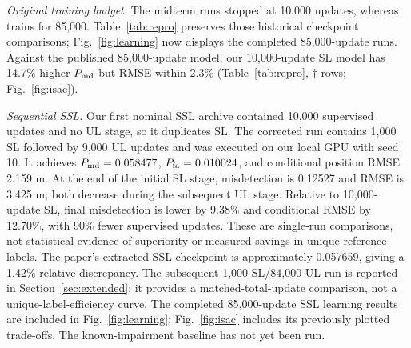 \documentclass[conference]{IEEEtran}
\begin{document}
\emph{Original training budget.} The midterm runs stopped at 10,000 updates, whereas~\cite{ssl} trains for 85,000. Table~\ref{tab:repro} preserves those historical checkpoint comparisons; Fig.~\ref{fig:learning} now displays the completed 85,000-update runs. Against the published 85,000-update model, our 10,000-update SL model has 14.7\% higher $P_{\rm md}$ but RMSE within 2.3\% (Table~\ref{tab:repro}, $\dagger$ rows; Fig.~\ref{fig:isac}).

\emph{Sequential SSL.} Our first nominal SSL archive contained 10,000 supervised updates and no UL stage, so it duplicates SL. The corrected run contains 1,000 SL followed by 9,000 UL updates and was executed on our local GPU with seed 10. It achieves $P_{\rm md}=0.058477$, $P_{\rm fa}=0.010024$, and conditional position RMSE 2.159 m. At the end of the initial SL stage, misdetection is 0.12527 and RMSE is 3.425 m; both decrease during the subsequent UL stage. Relative to 10,000-update SL, final misdetection is lower by 9.38\% and conditional RMSE by 12.70\%, with 90\% fewer supervised updates. These are single-run comparisons, not statistical evidence of superiority or measured savings in unique reference labels. The paper's extracted SSL checkpoint is approximately 0.057659, giving a 1.42\% relative discrepancy. The subsequent 1,000-SL/84,000-UL run is reported in Section~\ref{sec:extended}; it provides a matched-total-update comparison, not a unique-label-efficiency curve. The completed 85,000-update SSL learning results are included in Fig.~\ref{fig:learning}; Fig.~\ref{fig:isac} includes its previously plotted trade-offs. The known-impairment baseline has not yet been run.
\end{document}
